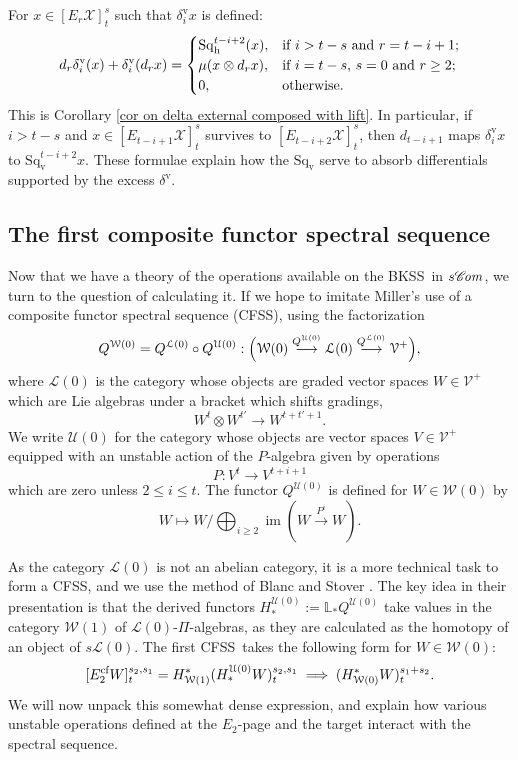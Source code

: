 \documentclass[11pt]{amsart} \renewcommand{\baselinestretch}{1.2}
\theoremstyle{plain}
\numberwithin{equation}{section} %
\theoremstyle{plain}
\numberwithin{equation}{chapter} %
\DeclareMathOperator{\im}{im}
\renewcommand{\to}{\longrightarrow}
\newcommand{\scrC}{\mathscr{C}}
\newcommand{\calV}{\mathcal{V}}
\newcommand{\calw}{\mathcal{W}}
\newcommand{\calu}{\mathcal{U}}
\newcommand{\call}{\mathcal{L}}
\newcommand{\calx}{\mathcal{X}}
\newcommand{\vect}[2]{\calV^{#1}_{#2}}
\newcommand{\algs}{{\scrC\!\textit{\normalfont\textit{om}}}}
\newcommand{\E}[5]{[E^{#1}_{#2}#3]^{#4}_{#5}}
\newcommand{\uver}{^\mathrm{v}}
\newcommand{\dver}{_\mathrm{v}}
\newcommand{\dhor}{_\mathrm{h}}
\newcommand{\Sqh}{\mathrm{Sq}\dhor}
\newcommand{\Sqv}{\mathrm{Sq}\dver}
\newcommand{\deltav}{\delta\uver}
\renewcommand{\mapsto}{\longmapsto}
\newcommand{\BKSS}{BKSS}
\newcommand{\CFSS}{CFSS}
\newcommand{\SubsectionOrSection}[1]{\subsection{#1}}
\begin{document}
\begin{Introduction}
For $x\in \E{}{r}{\calx}{s}{t}$ such that  $\deltav_ix $ is defined:
\[d_r\deltav_i(x)+ \deltav_i(d_rx)=\begin{cases}
\Sqh^{t-i+2}(x),&\textup{if $i>t-s$ and $r =t-i+1$};\\
\mu(x\otimes d_rx),&\textup{if $i=t-s$,  $s=0$ and $r\geq2$};\\
0,&\textup{otherwise.}
\end{cases}\]
This is Corollary \ref{cor on delta external composed with lift}. In particular, if $i>t-s$ and $x\in\E{}{t-i+1}{\calx}{s}{t}$ survives to $\E{}{t-i+2}{\calx}{s}{t}$, then $d_{t-i+1}$ maps $\deltav_ix$ to $\Sqv^{t-i+2}x$. These formulae explain how the $\Sqv$ serve to absorb differentials supported by the excess $\deltav$.

\SubsectionOrSection{The first composite functor spectral sequence}
\label{The first composite functor spectral sequence}
Now that we have a theory of the operations available on the \BKSS\ in $s\algs$, we turn to the question of calculating it. If we hope to imitate Miller's use of a composite functor spectral sequence (\CFSS), %
using the factorization
\[Q^{\calw(0)}=Q^{\call(0)}\circ Q^{\calu(0)}  : \Bigl(\calw(0)\overset{Q^{\calu(0)}}{\to}\call(0)\overset{Q^{\call(0)}}{\to}\vect{+}{}\Bigr),\]
where $\call(0)$ is the category whose objects are graded vector spaces $W\in\vect{+}{}$ which are Lie algebras under a bracket which shifts gradings,
\[W^{t}\otimes W^{t'}\to W^{t+t'+1}.\]
We write $\calu(0)$ for the category whose objects are vector spaces $V\in \vect{+}{}$ equipped with an unstable action of the $P$-algebra given by operations
\[P:V^t\to V^{t+i+1}\]
which are zero unless $2\leq i\leq t$. The functor $Q^{\calu(0)}$ is defined for $W\in\calw(0)$ by
\[W\mapsto W/\textstyle\bigoplus_{i\geq2}\im(W\overset{P^i}{\to}W).\]

As the category $\call(0)$ is not an abelian category, it is a more technical task to form a \CFSS, and we use the method of Blanc and Stover \cite{Blanc_Stover-Groth_SS.pdf}. The key idea in their presentation is that the derived functors
$H_*^{\calu(0)}:=\mathbb{L}_*Q^{\calu(0)}$
take values in the category  $\calw(1)$ of $\call(0)$-$\Pi$-algebras, as they are calculated as the homotopy of an object of $s\call(0)$.
The first \CFSS\ takes the following form  for $W\in\calw(0)$:
\[\E{\textup{cf}}{2}{W}{s_2,s_1}{t}=H^*_{\calw(1)}(H_*^{\calu(0)}W)^{s_2,s_1}_t\implies (H^*_{\calw(0)} W)_t^{s_1+s_2}.\]
We will now unpack this somewhat dense expression, and explain how various unstable operations defined at the $E_2$-page and the target interact with the spectral sequence.


\end{Introduction}
\end{document}
